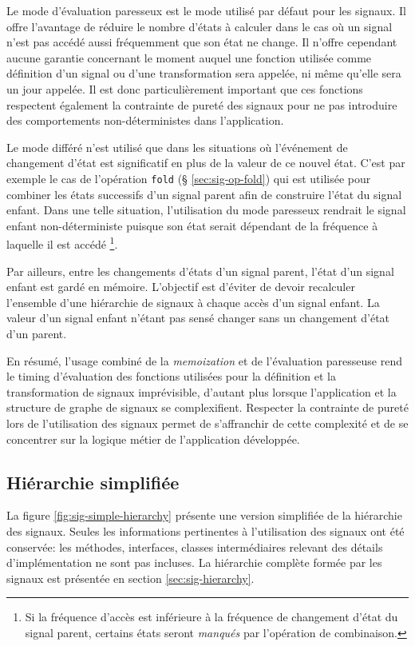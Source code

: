 Le mode d'évaluation paresseux est le mode utilisé par défaut pour les signaux. Il offre l'avantage de réduire le nombre d'états à calculer dans le cas où un signal n'est pas accédé aussi fréquemment que son état ne change. Il n'offre cependant aucune garantie concernant le moment auquel une fonction utilisée comme définition d'un signal ou d'une transformation sera appelée, ni même qu'elle sera un jour appelée. Il est donc particulièrement important que ces fonctions respectent également la contrainte de pureté des signaux pour ne pas introduire des comportements non-déterministes dans l'application.

Le mode différé n'est utilisé que dans les situations où l'événement de changement d'état est significatif en plus de la valeur de ce nouvel état. C'est par exemple le cas de l'opération \texttt{fold} (§ \ref{sec:sig-op-fold}) qui est utilisée pour combiner les états successifs d'un signal parent afin de construire l'état du signal enfant. Dans une telle situation, l'utilisation du mode paresseux rendrait le signal enfant non-déterministe puisque son état serait dépendant de la fréquence à laquelle il est accédé \footnote{Si la fréquence d'accès est inférieure à la fréquence de changement d'état du signal parent, certains états seront \emph{manqués} par l'opération de combinaison.}.

Par ailleurs, entre les changements d'états d'un signal parent, l'état d'un signal enfant est gardé en mémoire. L'objectif est d'éviter de devoir recalculer l'ensemble d'une hiérarchie de signaux à chaque accès d'un signal enfant. La valeur d'un signal enfant n'étant pas sensé changer sans un changement d'état d'un parent.

En résumé, l'usage combiné de la \emph{memoization} et de l'évaluation paresseuse rend le timing d'évaluation des fonctions utilisées pour la définition et la transformation de signaux imprévisible, d'autant plus lorsque l'application et la structure de graphe de signaux se complexifient. Respecter la contrainte de pureté lors de l'utilisation des signaux permet de s'affranchir de cette complexité et de se concentrer sur la logique métier de l'application développée.

\subsection{Hiérarchie simplifiée}
La figure \ref{fig:sig-simple-hierarchy} présente une version simplifiée de la hiérarchie des signaux. Seules les informations pertinentes à l'utilisation des signaux ont été conservée: les méthodes, interfaces, classes intermédiaires relevant des détails d'implémentation ne sont pas incluses. La hiérarchie complète formée par les signaux est présentée en section \ref{sec:sig-hierarchy}.

